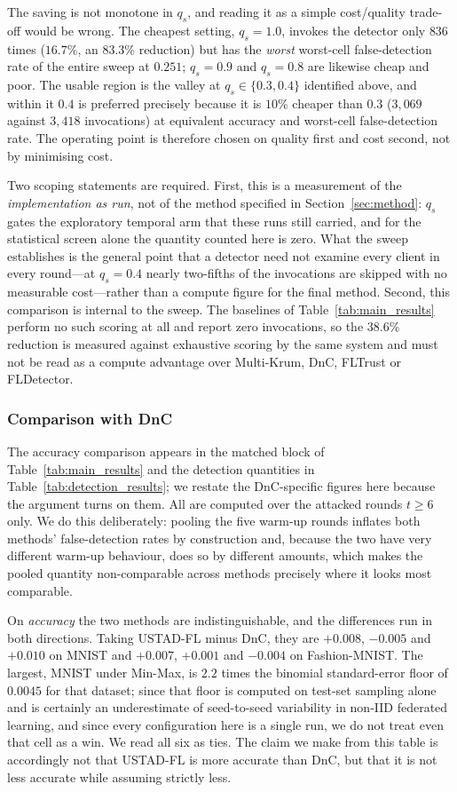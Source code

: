 \documentclass[journal]{IEEEtran}
\begin{document}
The saving is not monotone in $q_s$, and reading it as a simple cost/quality trade-off would
be wrong. The cheapest setting, $q_s = 1.0$, invokes the detector only $836$ times
($16.7\%$, an $83.3\%$ reduction) but has the \emph{worst} worst-cell false-detection rate of
the entire sweep at $0.251$; $q_s = 0.9$ and $q_s = 0.8$ are likewise cheap and poor. The
usable region is the valley at $q_s \in \{0.3, 0.4\}$ identified above, and within it $0.4$
is preferred precisely because it is $10\%$ cheaper than $0.3$ ($3{,}069$ against $3{,}418$
invocations) at equivalent accuracy and worst-cell false-detection rate. The operating point
is therefore chosen on quality first and cost second, not by minimising cost.

Two scoping statements are required. First, this is a measurement of the \emph{implementation
as run}, not of the method specified in Section~\ref{sec:method}: $q_s$ gates the exploratory
temporal arm that these runs still carried, and for the statistical screen alone the quantity
counted here is zero. What the sweep establishes is the general point that a detector need
not examine every client in every round---at $q_s = 0.4$ nearly two-fifths of the invocations
are skipped with no measurable cost---rather than a compute figure for the final method.
Second, this comparison is internal to the sweep. The baselines of
Table~\ref{tab:main_results} perform no such scoring at all and report zero invocations, so
the $38.6\%$ reduction is measured against exhaustive scoring by the same system and must not
be read as a compute advantage over Multi-Krum, DnC, FLTrust or FLDetector.

\subsubsection{Comparison with DnC}
The accuracy comparison appears in the matched block of Table~\ref{tab:main_results} and the detection quantities in Table~\ref{tab:detection_results}; we restate the DnC-specific figures here because the argument turns on them. All are computed over the attacked rounds $t \ge 6$ only. We do this deliberately: pooling the five warm-up rounds inflates both methods' false-detection rates by construction and, because the two have very different warm-up behaviour, does so by different amounts, which makes the pooled quantity non-comparable across methods precisely where it looks most comparable.

On \emph{accuracy} the two methods are indistinguishable, and the differences run in both directions. Taking USTAD-FL minus DnC, they are $+0.008$, $-0.005$ and $+0.010$ on MNIST and $+0.007$, $+0.001$ and $-0.004$ on Fashion-MNIST. The largest, MNIST under Min-Max, is $2.2$ times the binomial standard-error floor of $0.0045$ for that dataset; since that floor is computed on test-set sampling alone and is certainly an underestimate of seed-to-seed variability in non-IID federated learning, and since every configuration here is a single run, we do not treat even that cell as a win. We read all six as ties. The claim we make from this table is accordingly not that USTAD-FL is more accurate than DnC, but that it is not less accurate while assuming strictly less.
\end{document}

